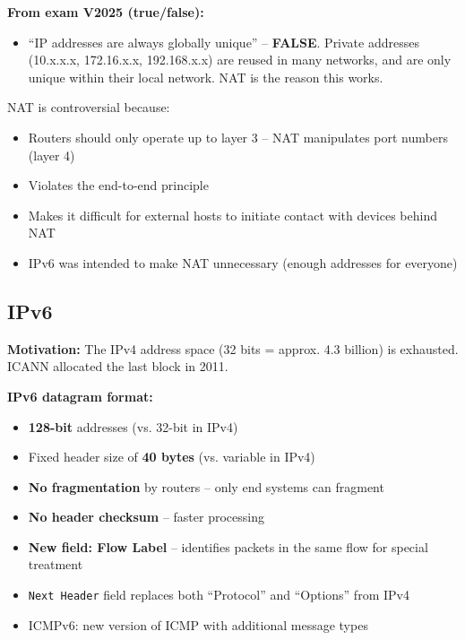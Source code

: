 \begin{exambox}
\textbf{From exam V2025 (true/false):}
\begin{itemize}[noitemsep]
    \item ``IP addresses are always globally unique'' -- \textbf{FALSE}. Private addresses (10.x.x.x, 172.16.x.x, 192.168.x.x) are reused in many networks, and are only unique within their local network. NAT is the reason this works.
\end{itemize}
\end{exambox}

\begin{imagebox}
\end{imagebox}

\begin{warnbox}
NAT is controversial because:
\begin{itemize}[noitemsep]
    \item Routers should only operate up to layer 3 -- NAT manipulates port numbers (layer 4)
    \item Violates the end-to-end principle
    \item Makes it difficult for external hosts to initiate contact with devices behind NAT
    \item IPv6 was intended to make NAT unnecessary (enough addresses for everyone)
\end{itemize}
\end{warnbox}

\subsection{IPv6}

\begin{keybox}
\textbf{Motivation:} The IPv4 address space (32 bits = approx. 4.3 billion) is exhausted. ICANN allocated the last block in 2011.

\textbf{IPv6 datagram format:}
\begin{itemize}[noitemsep]
    \item \textbf{128-bit} addresses (vs. 32-bit in IPv4)
    \item Fixed header size of \textbf{40 bytes} (vs. variable in IPv4)
    \item \textbf{No fragmentation} by routers -- only end systems can fragment
    \item \textbf{No header checksum} -- faster processing
    \item \textbf{New field: Flow Label} -- identifies packets in the same flow for special treatment
    \item \texttt{Next Header} field replaces both ``Protocol'' and ``Options'' from IPv4
    \item ICMPv6: new version of ICMP with additional message types
\end{itemize}
\end{keybox}

